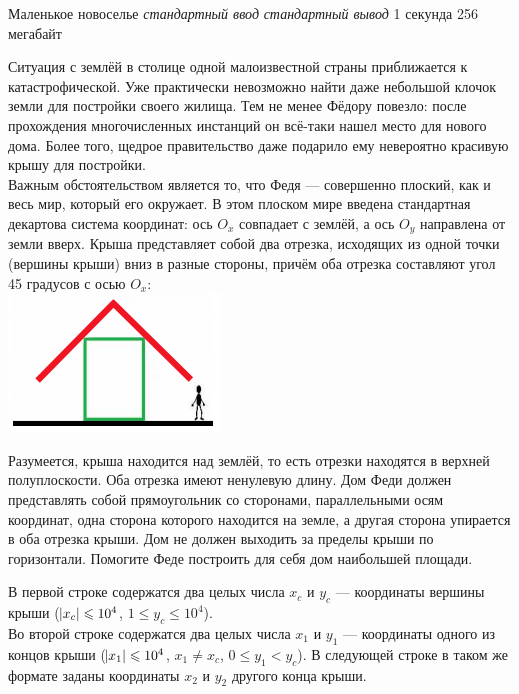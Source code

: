 \begin{problem}%
{Маленькое новоселье}%
{\textsl{стандартный ввод}}%
{\textsl{стандартный вывод}}%
{1 секунда}%
{256 мегабайт}{}

Ситуация с землёй в столице одной малоизвестной страны приближается к катастрофической. Уже практически невозможно найти даже небольшой клочок земли для постройки своего жилища.
Тем не менее Фёдору повезло: после прохождения многочисленных инстанций он всё-таки нашел место для нового дома. Более того, щедрое правительство даже подарило ему невероятно красивую крышу для постройки.\\

Важным обстоятельством является то, что Федя — совершенно плоский, как и весь мир, который его окружает. В этом плоском мире введена стандартная декартова система координат: ось $O_x$ совпадает с землёй, а ось $O_y$ направлена от земли вверх. Крыша представляет собой два отрезка, исходящих из одной точки (вершины крыши) вниз в разные стороны, причём оба отрезка составляют угол 45 градусов с осью $O_x$:\\

\includegraphics[]{images/1.png}

Разумеется, крыша находится над землёй, то есть отрезки находятся в верхней полуплоскости. Оба отрезка имеют ненулевую длину. Дом Феди должен представлять собой прямоугольник со сторонами, параллельными осям координат, одна сторона которого находится на земле, а другая сторона упирается в оба отрезка крыши. Дом не должен выходить за пределы крыши по горизонтали. Помогите Феде построить для себя дом наибольшей площади.

\InputFile

В первой строке содержатся два целых числа $x_c$ и $y_c$ — координаты вершины крыши ($\abs{x_c} \leqslant 10^4$, $1 \le y_c \le 10^4$).\\

Во второй строке содержатся два целых числа $x_1$ и $y_1$ — координаты одного из концов крыши ($\abs{x_1} \leqslant 10^4$, $x_1 \ne x_c$, $0 \le y_1 < y_c$). В следующей строке в таком же формате заданы координаты $x_2$ и $y_2$ другого конца крыши.\\


\end{problem}
